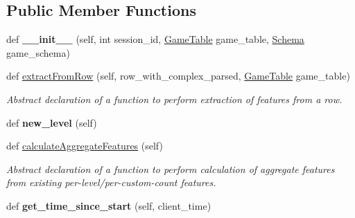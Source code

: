 \subsection*{Public Member Functions}
\begin{DoxyCompactItemize}
\item 
\mbox{\label{classfeature__extractors_1_1_jowilder_extractor_1_1_jowilder_extractor_a67b9819beee2186c7ccdc50b507fe98a}} 
def {\bfseries \+\_\+\+\_\+init\+\_\+\+\_\+} (self, int session\+\_\+id, \mbox{\hyperlink{class_game_table_1_1_game_table}{Game\+Table}} game\+\_\+table, \mbox{\hyperlink{classschemas_1_1_schema_1_1_schema}{Schema}} game\+\_\+schema)
\item 
def \mbox{\hyperlink{classfeature__extractors_1_1_jowilder_extractor_1_1_jowilder_extractor_a02ab1ac9f1234341dc74610d4a5606d0}{extract\+From\+Row}} (self, row\+\_\+with\+\_\+complex\+\_\+parsed, \mbox{\hyperlink{class_game_table_1_1_game_table}{Game\+Table}} game\+\_\+table)
\begin{DoxyCompactList}\small\item\em Abstract declaration of a function to perform extraction of features from a row. \end{DoxyCompactList}\item 
\mbox{\label{classfeature__extractors_1_1_jowilder_extractor_1_1_jowilder_extractor_a6091a967a282b6077b0e3b05032aef8c}} 
def {\bfseries new\+\_\+level} (self)
\item 
def \mbox{\hyperlink{classfeature__extractors_1_1_jowilder_extractor_1_1_jowilder_extractor_aa8634d50ee53ef7244de9a53f45ba9e5}{calculate\+Aggregate\+Features}} (self)
\begin{DoxyCompactList}\small\item\em Abstract declaration of a function to perform calculation of aggregate features from existing per-\/level/per-\/custom-\/count features. \end{DoxyCompactList}\item 
\mbox{\label{classfeature__extractors_1_1_jowilder_extractor_1_1_jowilder_extractor_a9ebf3b31ab63cd4a0cf17a1634da68d2}} 
def {\bfseries get\+\_\+time\+\_\+since\+\_\+start} (self, client\+\_\+time)
\item 

\end{DoxyCompactItemize}
